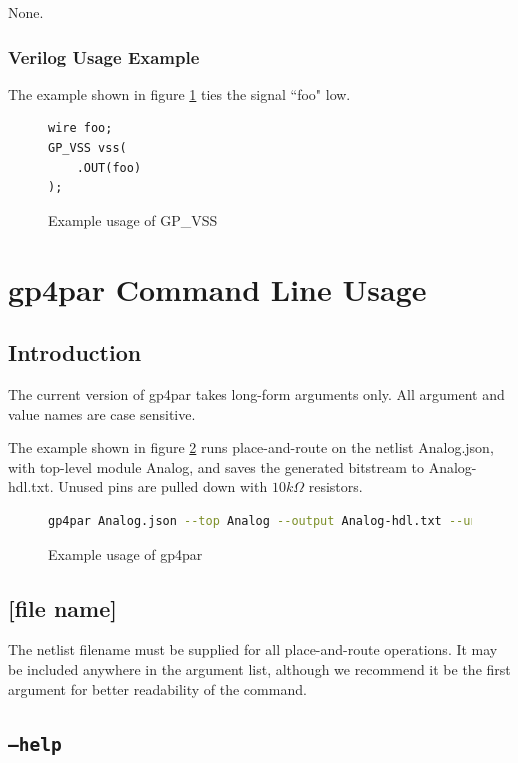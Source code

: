 \documentclass[11pt]{article}
\begin{document}
None.

\subsubsection{Verilog Usage Example}

The example shown in figure \ref{gp-vss-example} ties the signal ``foo" low.

\begin{figure}[h]
\begin{lstlisting}
wire foo;
GP_VSS vss(
	.OUT(foo)
);
\end{lstlisting}
\caption{Example usage of GP\_VSS}
\label{gp-vss-example}
\end{figure}

\pagebreak
\section{gp4par Command Line Usage}

\subsection{Introduction}

The current version of gp4par takes long-form arguments only. All argument and value names are case sensitive.

The example shown in figure \ref{gp-cmd-example} runs place-and-route on the netlist Analog.json, with top-level module 
Analog, and saves the generated bitstream to Analog-hdl.txt. Unused pins are pulled down with $10 k\Omega$ resistors.

\begin{figure}[h]
\begin{lstlisting}[language=sh]
gp4par Analog.json --top Analog --output Analog-hdl.txt --unused-pull down --unused-drive 10k
\end{lstlisting}
\caption{Example usage of gp4par}
\label{gp-cmd-example}
\end{figure}

\subsection{[file name]}

The netlist filename must be supplied for all place-and-route operations. It may be included anywhere in the argument 
list, although we recommend it be the first argument for better readability of the command.

\subsection{\texttt{--help}}
\end{document}
